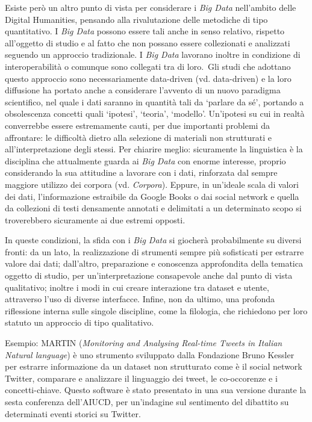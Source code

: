 Esiste però un altro punto di vista per considerare i \emph{Big Data}
nell'ambito delle Digital Humanities, pensando alla rivalutazione delle
metodiche di tipo quantitativo. I \emph{Big Data} possono essere tali
anche in senso relativo, rispetto all'oggetto di studio e al fatto che
non possano essere collezionati e analizzati seguendo un approccio
tradizionale. I \emph{Big Data} lavorano inoltre in condizione di
interoperabilità o comunque sono collegati tra di loro.~Gli studi che
adottano questo approccio sono necessariamente data-driven (vd.
data-driven) e la loro diffusione ha portato anche a considerare
l'avvento di un nuovo paradigma scientifico, nel quale i dati saranno in
quantità tali da `parlare da sé', portando a obsolescenza concetti quali
`ipotesi', `teoria', `modello'. Un'ipotesi su cui in realtà converrebbe
essere estremamente cauti, per due importanti problemi da affrontare: le
difficoltà dietro alla selezione di materiali non strutturati e
all'interpretazione degli stessi. Per chiarire meglio: sicuramente la
linguistica è la disciplina che attualmente guarda ai \emph{Big Data}
con enorme interesse, proprio considerando la sua attitudine a lavorare
con i dati, rinforzata dal sempre maggiore utilizzo dei corpora (vd.
\emph{Corpora}). Eppure, in un'ideale scala di valori dei dati,
l'informazione estraibile da Google Books o dai social network e quella
da collezioni di testi densamente annotati e delimitati a un determinato
scopo si troverebbero sicuramente ai due estremi opposti.

In queste condizioni, la sfida con i \emph{Big Data} si giocherà
probabilmente su diversi fronti: da un lato, la realizzazione di
strumenti sempre più sofisticati per estrarre valore dai dati;
dall'altro, preparazione e conoscenza approfondita della tematica
oggetto di studio, per un'interpretazione consapevole anche dal punto di
vista qualitativo; inoltre i modi in cui creare interazione tra dataset
e utente, attraverso l'uso di diverse interfacce. Infine, non da ultimo,
una profonda riflessione interna sulle singole discipline, come la
filologia, che richiedono per loro statuto un approccio di tipo
qualitativo.

Esempio: MARTIN (\emph{Monitoring and Analysing Real-time Tweets in
Italian Natural language}) è uno strumento sviluppato dalla Fondazione
Bruno Kessler per estrarre informazione da un dataset non strutturato
come è il social network Twitter, comparare e analizzare il linguaggio
dei tweet, le co-occorenze e i concetti-chiave. Questo software è stato
presentato in una sua versione durante la sesta conferenza dell'AIUCD,
per un'indagine sul sentimento del dibattito su determinati eventi
storici su Twitter.

